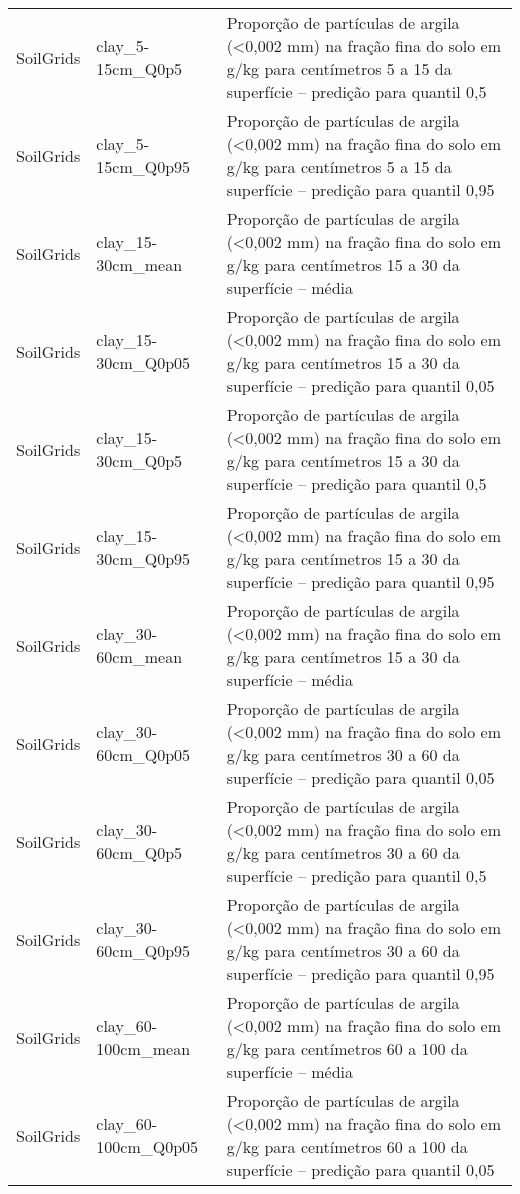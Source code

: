 \begin{longtable}{@{} p{4cm} p{4cm} p{8cm} @{}}
	SoilGrids &
	clay\_5-15cm\_Q0p5 &
	Proporção de partículas de argila (\textless 0,002 mm) na fração fina do solo em g/kg para centímetros 5 a 15 da superfície – predição para quantil 0,5 \\
	SoilGrids &
	clay\_5-15cm\_Q0p95 &
	Proporção de partículas de argila (\textless 0,002 mm) na fração fina do solo em g/kg para centímetros 5 a 15 da superfície – predição para quantil 0,95 \\
	SoilGrids &
	clay\_15-30cm\_mean &
	Proporção de partículas de argila (\textless 0,002 mm) na fração fina do solo em g/kg para centímetros 15 a 30 da superfície – média \\
	SoilGrids &
	clay\_15-30cm\_Q0p05 &
	Proporção de partículas de argila (\textless 0,002 mm) na fração fina do solo em g/kg para centímetros 15 a 30 da superfície – predição para quantil 0,05 \\
	SoilGrids &
	clay\_15-30cm\_Q0p5 &
	Proporção de partículas de argila (\textless 0,002 mm) na fração fina do solo em g/kg para centímetros 15 a 30 da superfície – predição para quantil 0,5 \\
	SoilGrids &
	clay\_15-30cm\_Q0p95 &
	Proporção de partículas de argila (\textless 0,002 mm) na fração fina do solo em g/kg para centímetros 15 a 30 da superfície – predição para quantil 0,95 \\
	SoilGrids &
	clay\_30-60cm\_mean &
	Proporção de partículas de argila (\textless 0,002 mm) na fração fina do solo em g/kg para centímetros 15 a 30 da superfície – média \\
	SoilGrids &
	clay\_30-60cm\_Q0p05 &
	Proporção de partículas de argila (\textless 0,002 mm) na fração fina do solo em g/kg para centímetros 30 a 60 da superfície – predição para quantil 0,05 \\
	SoilGrids &
	clay\_30-60cm\_Q0p5 &
	Proporção de partículas de argila (\textless 0,002 mm) na fração fina do solo em g/kg para centímetros 30 a 60 da superfície – predição para quantil 0,5 \\
	SoilGrids &
	clay\_30-60cm\_Q0p95 &
	Proporção de partículas de argila (\textless 0,002 mm) na fração fina do solo em g/kg para centímetros 30 a 60 da superfície – predição para quantil 0,95 \\
	SoilGrids &
	clay\_60-100cm\_mean &
	Proporção de partículas de argila (\textless 0,002 mm) na fração fina do solo em g/kg para centímetros 60 a 100 da superfície – média \\
	SoilGrids &
	clay\_60-100cm\_Q0p05 &
	Proporção de partículas de argila (\textless 0,002 mm) na fração fina do solo em g/kg para centímetros 60 a 100 da superfície – predição para quantil 0,05 \\

\end{longtable}

